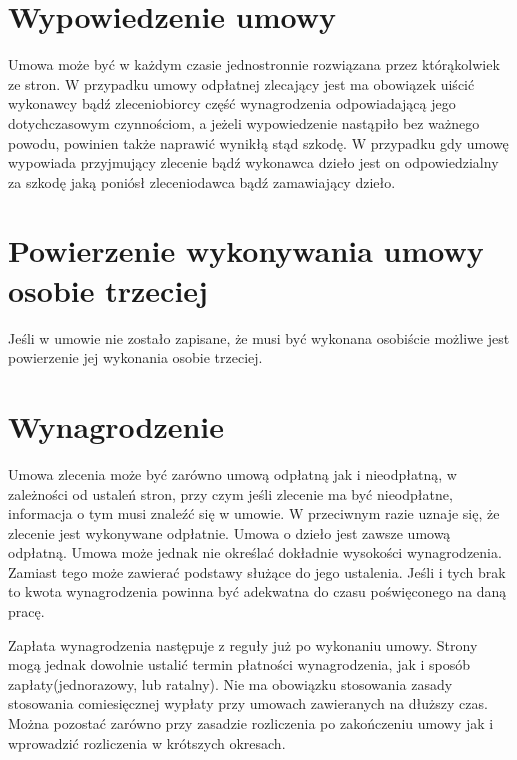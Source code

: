 \section[Wypowiedzenie umowy][Wypowiedzenie umowy]{Wypowiedzenie umowy}
Umowa może być w każdym czasie jednostronnie rozwiązana przez którąkolwiek ze stron. W przypadku umowy odpłatnej zlecający jest ma obowiązek uiścić wykonawcy bądź zleceniobiorcy część wynagrodzenia odpowiadającą jego dotychczasowym czynnościom, a jeżeli wypowiedzenie nastąpiło bez ważnego powodu, powinien także naprawić wynikłą stąd szkodę. W przypadku gdy umowę wypowiada przyjmujący zlecenie bądź wykonawca dzieło jest on odpowiedzialny za szkodę jaką poniósł zleceniodawca bądź zamawiający dzieło.

\section[Powierzenie wykonywania umowy osobie trzeciej][Powierzenie wykonywania umowy osobie trzeciej]{Powierzenie wykonywania umowy osobie trzeciej}
Jeśli w umowie nie zostało zapisane, że musi być wykonana osobiście możliwe jest powierzenie jej wykonania osobie trzeciej.

\section[Wynagrodzenie][Wynagrodzenie]{Wynagrodzenie}
Umowa zlecenia może być zarówno umową odpłatną jak i nieodpłatną, w zależności od ustaleń stron, przy czym jeśli zlecenie ma być nieodpłatne, informacja o tym musi znaleźć się w umowie. W przeciwnym razie uznaje się, że zlecenie jest wykonywane odpłatnie. Umowa o dzieło jest zawsze umową odpłatną. Umowa może jednak nie określać dokładnie wysokości wynagrodzenia. Zamiast tego może zawierać podstawy służące do jego ustalenia. Jeśli i tych brak to kwota wynagrodzenia powinna być adekwatna do czasu poświęconego na daną pracę.

Zapłata wynagrodzenia następuje z reguły już po wykonaniu umowy. Strony mogą jednak dowolnie ustalić termin płatności wynagrodzenia, jak i sposób zapłaty(jednorazowy, lub ratalny). Nie ma obowiązku stosowania zasady stosowania comiesięcznej wypłaty przy umowach zawieranych na dłuższy czas. Można pozostać zarówno przy zasadzie rozliczenia po zakończeniu umowy jak i wprowadzić rozliczenia w krótszych okresach.

